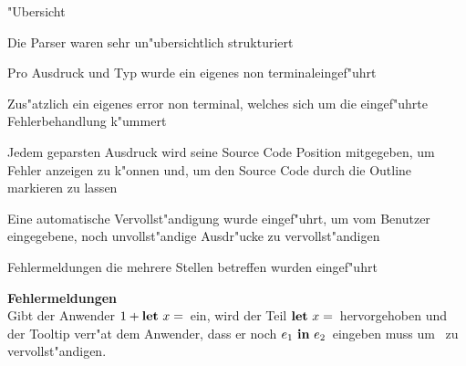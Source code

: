 {
  \begin{itemgroup}{"Ubersicht}
    \item Die Parser waren sehr un"ubersichtlich strukturiert
    \item Pro Ausdruck und Typ wurde ein eigenes \glqq non terminal\grqq eingef"uhrt
    \item Zus"atzlich ein eigenes \glqq error non terminal\grqq, welches sich um
          die eingef"uhrte Fehlerbehandlung k"ummert
    \item Jedem geparsten Ausdruck wird seine Source Code Position mitgegeben, um
          Fehler anzeigen zu k"onnen und, um den Source Code durch die Outline
          markieren zu lassen
    \item Eine automatische Vervollst"andigung wurde eingef"uhrt, um vom Benutzer
          eingegebene, noch unvollst"andige Ausdr"ucke zu vervollst"andigen
    \item Fehlermeldungen die mehrere Stellen betreffen wurden eingef"uhrt
  \end{itemgroup}
}

{
  {\bf Fehlermeldungen}\\[5mm]
  Gibt der Anwender \glqq$\infix{+}{1}{\blet\ x =}$\grqq\ 
  ein, wird der Teil \glqq$\blet\ x =$\grqq\ hervorgehoben und der Tooltip
  verr"at dem Anwender, dass er noch \glqq$e_1\ \bin\ e_2$\grqq\ eingeben muss
  um \glqq{\bf Let}\grqq\ zu vervollst"andigen.
}